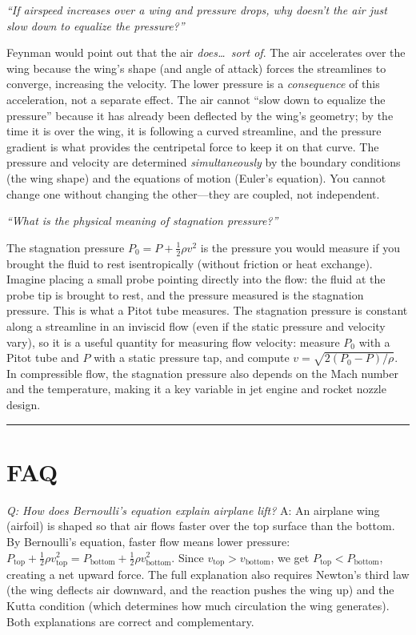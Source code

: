 \documentclass[11pt,openright]{book}
\begin{document}
\textit{``If airspeed increases over a wing and pressure drops, why doesn't the air just slow down to equalize the pressure?''}

Feynman would point out that the air \emph{does\ldots\ sort of}. The air accelerates over the wing because the wing's shape (and angle of attack) forces the streamlines to converge, increasing the velocity. The lower pressure is a \emph{consequence} of this acceleration, not a separate effect. The air cannot ``slow down to equalize the pressure'' because it has already been deflected by the wing's geometry; by the time it is over the wing, it is following a curved streamline, and the pressure gradient is what provides the centripetal force to keep it on that curve. The pressure and velocity are determined \emph{simultaneously} by the boundary conditions (the wing shape) and the equations of motion (Euler's equation). You cannot change one without changing the other---they are coupled, not independent.

\textit{``What is the physical meaning of stagnation pressure?''}

The stagnation pressure $P_0 = P + \frac{1}{2}\rho v^2$ is the pressure you would measure if you brought the fluid to rest isentropically (without friction or heat exchange). Imagine placing a small probe pointing directly into the flow: the fluid at the probe tip is brought to rest, and the pressure measured is the stagnation pressure. This is what a Pitot tube measures. The stagnation pressure is constant along a streamline in an inviscid flow (even if the static pressure and velocity vary), so it is a useful quantity for measuring flow velocity: measure $P_0$ with a Pitot tube and $P$ with a static pressure tap, and compute $v = \sqrt{2(P_0 - P)/\rho}$. In compressible flow, the stagnation pressure also depends on the Mach number and the temperature, making it a key variable in jet engine and rocket nozzle design.

\bigskip
\hrule
\bigskip
\section*{FAQ}

\textit{Q: How does Bernoulli's equation explain airplane lift?}
A: An airplane wing (airfoil) is shaped so that air flows faster over the top surface than the bottom. By Bernoulli's equation, faster flow means lower pressure: $P_{\text{top}} + \frac{1}{2}\rho v_{\text{top}}^2 = P_{\text{bottom}} + \frac{1}{2}\rho v_{\text{bottom}}^2$. Since $v_{\text{top}} > v_{\text{bottom}}$, we get $P_{\text{top}} < P_{\text{bottom}}$, creating a net upward force. The full explanation also requires Newton's third law (the wing deflects air downward, and the reaction pushes the wing up) and the Kutta condition (which determines how much circulation the wing generates). Both explanations are correct and complementary.
\end{document}
